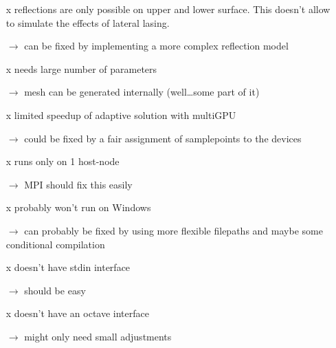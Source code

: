 \begin{itemize} 
  
  \item[x] reflections are only possible on upper and lower surface.  This
    doesn't allow to simulate the effects of lateral lasing.

  \item[$\rightarrow$] can be fixed by implementing a more complex reflection
    model

  \item[x] needs large number of parameters

  \item[$\rightarrow$] mesh can be generated internally (well\dots some part of
    it)

  \item[x] limited speedup of adaptive solution with multiGPU

  \item[$\rightarrow$] could be fixed by a fair assignment of samplepoints to
    the devices

  \item[x] runs only on 1 host-node

  \item[$\rightarrow$] MPI should fix this easily

  \item[x] probably won't run on Windows

  \item[$\rightarrow$] can probably be fixed by using more flexible filepaths
    and maybe some conditional compilation

  \item[x] doesn't have stdin interface

  \item[$\rightarrow$] should be easy 

  \item[x] doesn't have an octave interface

  \item[$\rightarrow$] might only need small adjustments 

\end{itemize}
